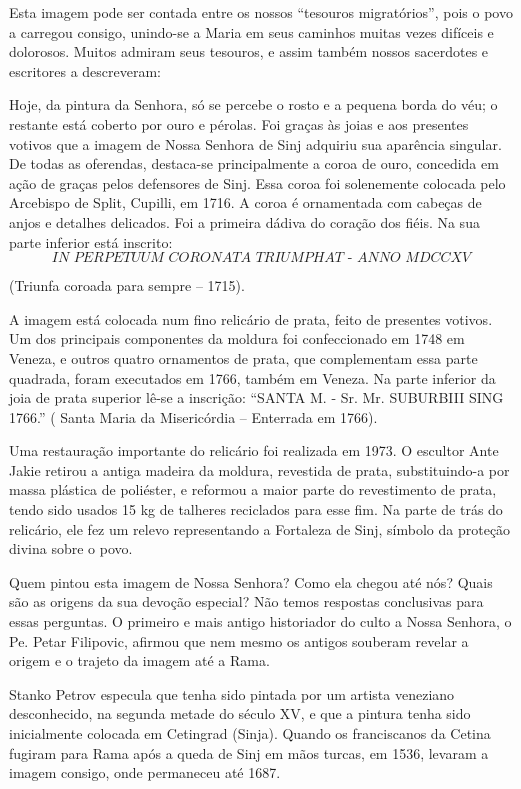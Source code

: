 \documentclass[a4paper,14pt]{extarticle} \usepackage[utf8]{inputenc}
\begin{document}
Esta imagem pode ser contada entre os nossos “tesouros migratórios”, pois o povo a carregou consigo, unindo-se a Maria em seus caminhos muitas vezes difíceis e dolorosos. Muitos admiram seus tesouros, e assim também nossos sacerdotes e escritores a descreveram:

Hoje, da pintura da Senhora, só se percebe o rosto e a pequena borda do véu; o restante está coberto por ouro e pérolas. Foi graças às joias e aos presentes votivos que a imagem de Nossa Senhora de Sinj adquiriu sua aparência singular. De todas as oferendas, destaca-se principalmente a coroa de ouro, concedida em ação de graças pelos defensores de Sinj. Essa coroa foi solenemente colocada pelo Arcebispo de Split, Cupilli, em 1716. A coroa é ornamentada com cabeças de anjos e detalhes delicados. Foi a primeira dádiva do coração dos fiéis. Na sua parte inferior está inscrito:  
$$ \textit{IN PERPETUUM CORONATA TRIUMPHAT - ANNO MDCCXV} $$
\begin{center}
(Triunfa coroada para sempre – 1715).
\end{center}

A imagem está colocada num fino relicário de prata, feito de presentes votivos. Um dos principais componentes da moldura foi confeccionado em 1748 em Veneza, e outros quatro ornamentos de prata, que complementam essa parte quadrada, foram executados em 1766, também em Veneza. Na parte inferior da joia de prata superior lê-se a inscrição:  
“SANTA M. - Sr. Mr. SUBURBIII SING 1766.”  
( Santa Maria da Misericórdia – Enterrada em 1766).

Uma restauração importante do relicário foi realizada em 1973. O escultor Ante Jakie retirou a antiga madeira da moldura, revestida de prata, substituindo-a por massa plástica de poliéster, e reformou a maior parte do revestimento de prata, tendo sido usados 15 kg de talheres reciclados para esse fim. Na parte de trás do relicário, ele fez um relevo representando a Fortaleza de Sinj, símbolo da proteção divina sobre o povo.

Quem pintou esta imagem de Nossa Senhora? Como ela chegou até nós? Quais são as origens da sua devoção especial? Não temos respostas conclusivas para essas perguntas. O primeiro e mais antigo historiador do culto a Nossa Senhora, o Pe. Petar Filipovic, afirmou que nem mesmo os antigos souberam revelar a origem e o trajeto da imagem até a Rama.

Stanko Petrov especula que tenha sido pintada por um artista veneziano desconhecido, na segunda metade do século XV, e que a pintura tenha sido inicialmente colocada em Cetingrad (Sinja). Quando os franciscanos da Cetina fugiram para Rama após a queda de Sinj em mãos turcas, em 1536, levaram a imagem consigo, onde permaneceu até 1687.
\end{document}
